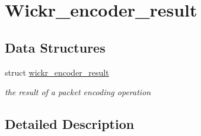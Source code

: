 \hypertarget{group__wickr__encoder__result}{}\section{Wickr\+\_\+encoder\+\_\+result}
\label{group__wickr__encoder__result}
\subsection*{Data Structures}
\begin{DoxyCompactItemize}
\item 
struct \mbox{\hyperlink{structwickr__encoder__result}{wickr\+\_\+encoder\+\_\+result}}
\begin{DoxyCompactList}\small\item\em the result of a packet encoding operation \end{DoxyCompactList}\end{DoxyCompactItemize}


\subsection{Detailed Description}
